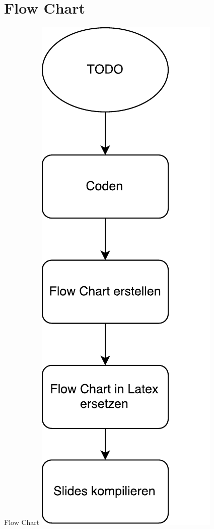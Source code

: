 \section{Flow Chart}
\begin{frame}{Flow Chart}
	\centering
  	\includegraphics[scale=0.4]{FlowChartTodo.pdf}
\end{frame}

